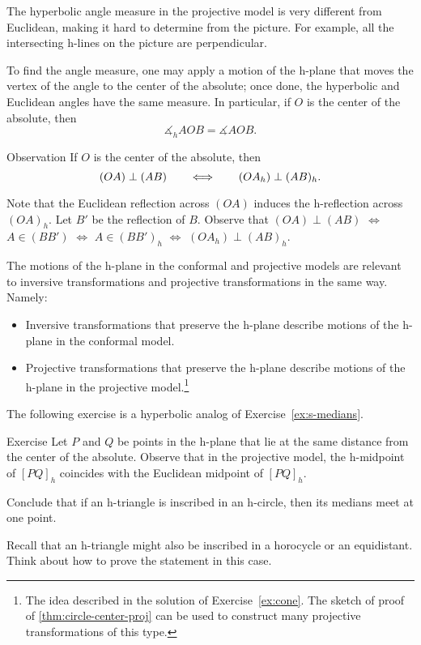 The hyperbolic angle measure in the projective model is very different from Euclidean, making it hard to determine from the picture. 
\label{klein-angles}
For example, all the intersecting h-lines on the picture 
are perpendicular.

To find the angle measure,
one may apply a motion of the h-plane that moves 
the vertex of the angle to the center of the absolute;
once done, the hyperbolic and Euclidean angles have the same measure.
In particular, if $O$ is the center of the absolute, then 
$$\measuredangle_hAOB=\measuredangle AOB.$$

\begin{thm}{Observation}\label{obs:h-p-perp}
If $O$ is the center of the absolute, then 
\[(OA)\perp (AB)\qquad\Longleftrightarrow\qquad(OA_h)\perp (AB)_h.\]

\end{thm}

Note that the Euclidean reflection across $(OA)$ induces the h-reflection across $(OA)_h$.
Let $B'$ be the reflection of $B$.
Observe that $(OA)\perp (AB)$ $\Longleftrightarrow$ $A\in(BB')$ $\Longleftrightarrow$  $A\in(BB')_h$ $\Longleftrightarrow$  $(OA_h)\perp (AB)_h$.
\qeds

The motions of the h-plane in the conformal and projective models are relevant to inversive transformations and projective transformations in the same way.
Namely: 
\begin{itemize}
\item Inversive transformations that preserve the h-plane describe motions of the h-plane in the conformal model.
\item Projective transformations that preserve the h-plane describe motions of the h-plane in the projective model.\footnote{The idea described in the solution of Exercise~\ref{ex:cone}.
The sketch of proof of \ref{thm:circle-center-proj} can be used to construct many projective transformations of this type.}
\end{itemize}

The following exercise is a hyperbolic analog of Exercise~\ref{ex:s-medians}. 

\begin{thm}{Exercise}\label{ex:h-median}
Let $P$ and $Q$ be points in the h-plane that lie at the same distance from the center of the absolute.
Observe that in the projective model, the h-midpoint of $[PQ]_h$ coincides with the Euclidean midpoint of $[PQ]_h$.

Conclude that if an h-triangle is inscribed in an h-circle, then its medians meet at one point.

Recall that an h-triangle might also be inscribed in a horocycle or an equidistant.
Think about how to prove the statement in this case.
\end{thm}

